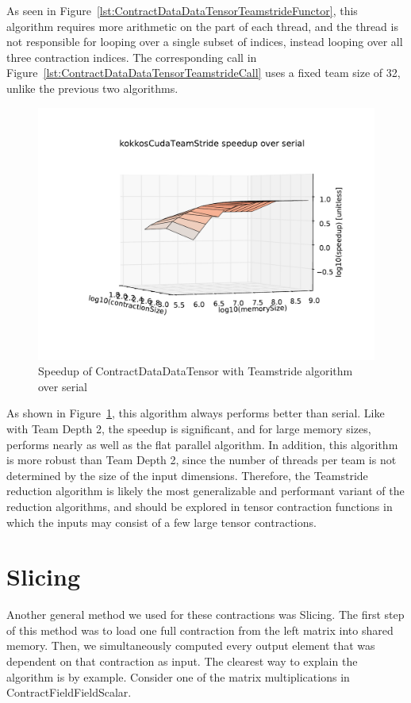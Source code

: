 As seen in Figure~\ref{lst:ContractDataDataTensorTeamstrideFunctor}, this
algorithm requires more arithmetic on the part of each thread, and the thread
is not responsible for looping over a single subset of indices, instead looping
over all three contraction indices. The corresponding call in
Figure~\ref{lst:ContractDataDataTensorTeamstrideCall} uses a fixed team size of
32, unlike the previous two algorithms.

\begin{figure}[ht]
    \includegraphics[scale=.55]{./VersusSerial_kokkosCudaTeamStride_clearCache_shadowfax.pdf}
\caption{Speedup of ContractDataDataTensor with Teamstride algorithm over
    serial
\label{fig:ContractDataDataTensorTeamstride}} 
\end{figure}

As shown in Figure~\ref{fig:ContractDataDataTensorTeamstride}, this algorithm
always performs better than serial.  Like with Team Depth 2, the speedup is
significant, and for large memory sizes, performs nearly as well as the flat
parallel algorithm.  In addition, this algorithm is more robust than Team Depth
2, since the number of threads per team is not determined by the size of the
input dimensions.  Therefore, the Teamstride reduction algorithm is likely the
most generalizable and performant variant of the reduction algorithms, and
should be explored in tensor contraction functions in which the inputs may
consist of a few large tensor contractions.

\section{Slicing}
Another general method we used for these contractions was Slicing. The first step of this method was to load one full contraction from the left matrix into shared memory. Then, we simultaneously computed every output element that was dependent on that contraction as input. The clearest way to explain the algorithm is by example. Consider one of the matrix multiplications in ContractFieldFieldScalar. 

